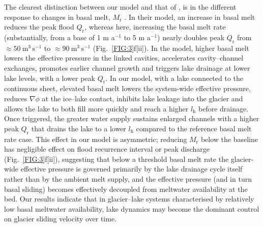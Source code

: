\documentclass[tc, manuscript]{copernicus}
\begin{document}
The clearest distinction between our model and that of \citet{kingslake2013modelling}, is in the different response to changes in basal melt, $M_{\mathrm{r}}$ \citep[denoted by cavity water supply, $M_{\mathrm{c}}$, in ][]{kingslake2013modelling}. In their model, an increase in basal melt reduces the peak flood $Q_{\mathrm{r}}$, whereas here, increasing the basal melt rate (substantially, from a base of 1 m a$^{-1}$ to 5 m a$^{-1}$) nearly doubles peak $Q_{\mathrm{r}}$ from $\approx50\ \mathrm{m}^{3}\, \mathrm{s}^{-1}$ to $\approx90\ \mathrm{m}^{3}\, \mathrm{s}^{-1}$  (Fig.~\ref{FIG:3}f[ii]). In the \citet{kingslake2013modelling} model, higher basal melt lowers the effective pressure in the linked cavities, accelerates cavity--channel exchanges, promotes earlier channel growth and triggers lake drainage at lower lake levels, with a lower peak $Q_{\mathrm{r}}$. In our model, with a lake connected to the continuous sheet, elevated basal melt lowers the system-wide effective pressure, reduces $\nabla \phi$ at the ice--lake contact, inhibits lake leakage into the glacier and allows the lake to both fill more quickly and reach a higher $l_{\mathrm{h}}$ before drainage. Once triggered, the greater water supply sustains enlarged channels with a higher peak $Q_{\mathrm{r}}$ that drains the lake to a lower $l_{\mathrm{h}}$ compared to the reference basal melt rate case. This effect in our model is asymmetric; reducing $M_{\mathrm{r}}$ below the baseline has negligible effect on flood recurrence interval or peak discharge (Fig.~\ref{FIG:3}f[ii]), suggesting that below a threshold basal melt rate the glacier-wide effective pressure is governed primarily by the lake drainage cycle itself rather than by the ambient melt supply, and the effective pressure (and in turn basal sliding) becomes effectively decoupled from meltwater availability at the bed. Our results indicate that in glacier--lake systems characterised by relatively low basal meltwater availability, lake dynamics may become the dominant control on glacier sliding velocity over time.
\end{document}
